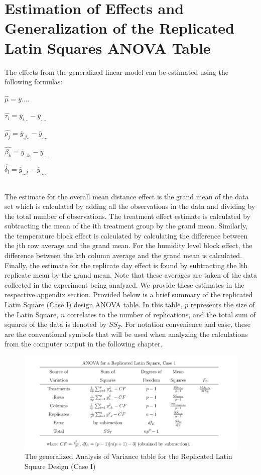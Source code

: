 \section{Estimation of Effects and Generalization of the Replicated Latin Squares ANOVA Table}
The effects from the generalized linear model can be estimated using the following formulas:\\
\centerline{$\hat{\mu} = \overline{y}....$}\newline
\centerline{$\hat{\tau_{i}} = \overline{y}_{i...} - \overline{y}_{....}$}\newline
\centerline{$\hat{\rho_{j}} = \overline{y}_{.j..} - \overline{y}_{....}$}\newline
\centerline{$\hat{\beta_{k}} = \overline{y}_{..k.} - \overline{y}_{....}$}\newline
\centerline{$\hat{\delta_{l}} = \overline{y}_{...l} - \overline{y}_{....}$}\\
The estimate for the overall mean distance effect is the grand mean of the data set which is calculated by adding all the observations in the data and dividing by the total number of observations. The treatment effect estimate is calculated by subtracting the mean of the ith treatment group by the grand mean. Similarly, the temperature block effect is calculated by calculating the difference between the jth row average and the grand mean. For the humidity level block effect, the difference between the kth column average and the grand mean is calculated. Finally, the estimate for the replicate day effect is found by subtracting the lth replicate mean by the grand mean. Note that these averages are taken of the data collected in the experiment being analyzed. We provide these estimates in the respective appendix section. Provided below is a brief summary of the replicated Latin Square (Case I) design ANOVA table. In this table, $p$ represents the size of the Latin Square, $n$ correlates to the number of replications, and the total sum of squares of the data is denoted by $SS_{T}$. For notation convenience and ease, these are the conventional symbols that will be used when analyzing the calculations from the computer output in the following chapter.\\
\begin{figure}[htp]
    \centering
    \includegraphics[width=150mm]{ANOVA_RepLS.png}
    \caption{The generalized Analysis of Variance table for the Replicated Latin Square Design (Case I)}
    \label{fig:ANOVA_Repls}
\end{figure}
